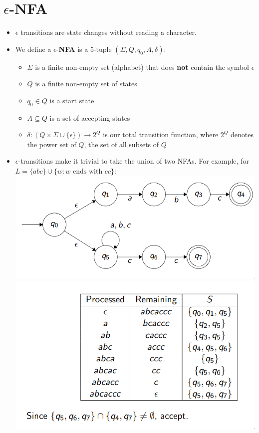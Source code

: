 \documentclass[12pt]{article}
\begin{document}
\section{\texorpdfstring{$\epsilon$-NFA}{e-NFA}}
\begin{itemize}
    \item $\epsilon$ transitions are state changes without reading a character.
    \item We define a $\epsilon$-\textbf{NFA} is a 5-tuple $(\Sigma, Q, q_0, A, \delta)$:
        \begin{itemize}
            \item $\Sigma$ is a finite non-empty set (alphabet) that does \textbf{not} contain the symbol $\epsilon$
            \item $Q$ is a finite non-empty set of states
            \item $q_0 \in Q$ is a start state
            \item $A \subseteq Q$ is a set of accepting states
            \item $\delta : (Q \times \Sigma \cup \{\epsilon\}) \rightarrow 2^Q$ is our total transition function, where $2^Q$ denotes the power set of $Q$, the set of all subsets of $Q$
        \end{itemize}
    \item $\epsilon$-transitions make it trivial to take the union of two NFAs.  For example, for $L = \{abc\} \cup \{w : w \text{ ends with } cc\}$: \\
        \includegraphics[scale=0.5]{ep-tran.png} \\
        \includegraphics[scale=0.5]{ep-trace.png}

\end{itemize}
\end{document}
